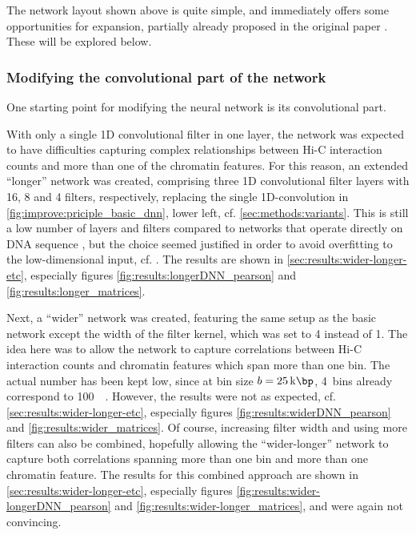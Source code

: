 The network layout shown above is quite simple, and immediately offers some opportunities
for expansion, partially already proposed in the original paper \cite{Farre2018a}.
These will be explored below.

\subsubsection{Modifying the convolutional part of the network} \label{sec:improve:convolution_extensions}
One starting point for modifying the neural network is its convolutional part.

With only a single 1D convolutional filter in one layer, the network was expected to have difficulties capturing complex relationships 
between Hi-C interaction counts and more than one of the chromatin features.
For this reason, an extended ``longer'' network was created, 
comprising three 1D convolutional filter layers with 16, 8 and 4 filters, respectively, replacing the single
1D-convolution in \cref{fig:improve:priciple_basic_dnn}, lower left, cf. \cref{sec:methods:variants}.
This is still a low number of layers and filters compared to networks that operate directly on DNA sequence \cite{Fudenberg2020}, 
but the choice seemed justified in order to avoid overfitting to the low-dimensional input, cf. \cite[fig.~S9]{Martens2020}. 
The results are shown in \cref{sec:results:wider-longer-etc}, especially figures \ref{fig:results:longerDNN_pearson} and \ref{fig:results:longer_matrices}.

Next, a ``wider'' network was created, featuring the same setup as the basic network
except the width of the filter kernel, which was set to 4 instead of 1.
The idea here was to allow the network to capture correlations between Hi-C interaction counts
and chromatin features which span more than one bin. 
The actual number has been kept low, since at bin size $b=\SI{25}{\kilo\bp}$, 4~bins already correspond to \SI{100}{\kilo\bp}.
However, the results were not as expected, cf. \cref{sec:results:wider-longer-etc}, especially figures \ref{fig:results:widerDNN_pearson} and \ref{fig:results:wider_matrices}.
Of course, increasing filter width and using more filters can also be combined,
hopefully allowing the  ``wider-longer'' network to capture both correlations
spanning more than one bin and more than one chromatin feature.
The results for this combined approach are shown in \cref{sec:results:wider-longer-etc}, 
especially figures \ref{fig:results:wider-longerDNN_pearson} and \ref{fig:results:wider-longer_matrices},
and were again not convincing.

